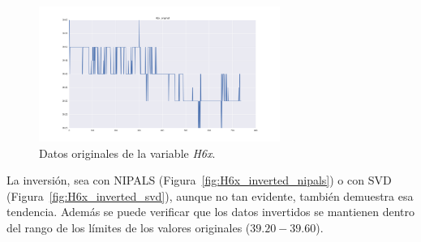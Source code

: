 \documentclass[11pt,spanish,listoffigures,listoftables]{tfgetsinf}
\begin{document}
    \begin{figure}[h]
        \centering
        \includegraphics[width=0.7\textwidth]{H6x_original.png}
        \caption{Datos originales de la variable {\em H6x}.}
        \label{fig:H6x_original}
    \end{figure}    
    
    La inversión, sea con NIPALS (Figura~\ref{fig:H6x_inverted_nipals}) o con SVD (Figura~\ref{fig:H6x_inverted_svd}), aunque no tan evidente, también demuestra esa tendencia. Además se puede verificar que los datos invertidos se mantienen dentro del rango de los límites de los valores originales (\(39.20-39.60\)).
\end{document}
